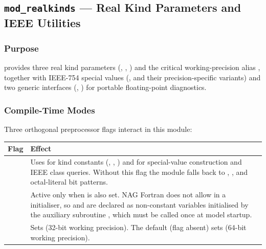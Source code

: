 \subsection{\texttt{mod\_realkinds} --- Real Kind Parameters and IEEE Utilities}
\label{subsec:realkinds}

\subsubsection{Purpose}

 provides three real kind parameters (,
, ) and the critical working-precision alias ,
together with IEEE-754 special values (,  and their
precision-specific variants) and two generic interfaces (,
) for portable floating-point diagnostics.

\subsubsection{Compile-Time Modes}

Three orthogonal preprocessor flags interact in this module:

\begin{longtable}{L{4cm} L{10cm}}
  \toprule
  \textbf{Flag} & \textbf{Effect} \\
  \midrule
  \endhead
  \bottomrule
  \endfoot
   &
    Uses  for kind constants (,
    , ) and  for
    special-value construction and IEEE class queries.
    Without this flag the module falls back to ,
    , and octal-literal bit patterns. \\
   &
    Active only when  is also set. NAG Fortran does not allow
     in a  initialiser, so 
    and  are declared as non-constant variables initialised by
    the auxiliary subroutine , which must be called
    once at model startup. \\
   &
    Sets  (32-bit working precision). The default (flag
    absent) sets  (64-bit working precision). \\
\end{longtable}

